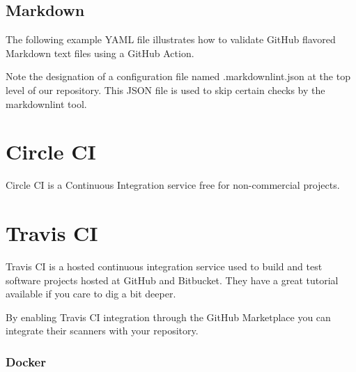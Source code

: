 %	

\subsection{Markdown}
\justify{}
The following example YAML file illustrates how to validate GitHub
flavored Markdown text files using a GitHub Action.

%	

\justify{}
Note the designation of a configuration file named .markdownlint.json at
the top level of our repository. This JSON file is used to skip certain
checks by the markdownlint tool.

\justify{}
%	

\section{Circle CI}
\justify{}
Circle CI is a Continuous Integration service free for non-commercial
projects.

\justify{}
%	 

\section{Travis CI}

\justify{}
Travis CI is a hosted continuous integration service used to build and
test software projects hosted at GitHub and Bitbucket. They have a great
tutorial available if you care to dig a bit deeper.

\justify{}
By enabling Travis CI integration through the GitHub Marketplace you
can integrate their scanners with your repository.

\subsubsection{Docker}

